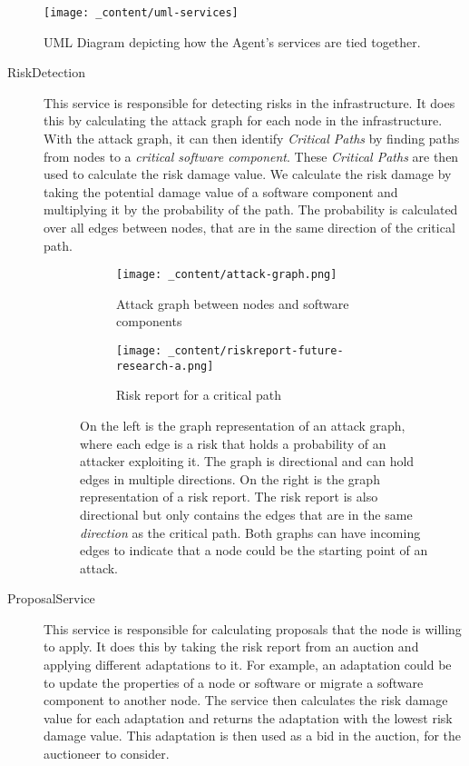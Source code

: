 \begin{figure}[H]
    \centering
    \texttt{[image: \_content/uml-services]}
    \caption{UML Diagram depicting how the Agent's services are tied together.}
    \label{fig:uml-services}
\end{figure}

\begin{description}
    \item[RiskDetection] This service is responsible for detecting risks in the infrastructure. It does this by calculating the attack graph for each node in the infrastructure. With the attack graph, it can then identify \textit{Critical Paths} by finding paths from nodes to a \textit{critical software component}. These \textit{Critical Paths} are then used to calculate the risk damage value. We calculate the risk damage by taking the potential damage value of a software component and multiplying it by the probability of the path. The probability is calculated over all edges between nodes, that are in the same direction of the critical path. 
    \begin{figure}[H]
        \centering
        \begin{subfigure}[b]{0.4\textwidth}
            \centering
            \texttt{[image: \_content/attack-graph.png]}
            \caption{Attack graph between nodes and software components}
            \label{fig:attack-graph}
        \end{subfigure}
        \hspace{0.5cm}
        \centering
        \begin{subfigure}[b]{0.4\textwidth}
            \centering
            \texttt{[image: \_content/riskreport-future-research-a.png]}
            \caption{Risk report for a critical path}
            \label{fig:risk-report}
        \end{subfigure}
        \caption{On the left is the graph representation of an attack graph, where each edge is a risk that holds a probability of an attacker exploiting it. The graph is directional and can hold edges in multiple directions. On the right is the graph representation of a risk report. The risk report is also directional but only contains the edges that are in the same \textit{direction} as the critical path. Both graphs can have incoming edges to indicate that a node could be the starting point of an attack.}
    \end{figure}

    \item[ProposalService] This service is responsible for calculating proposals that the node is willing to apply. It does this by taking the risk report from an auction and applying different adaptations to it. For example, an adaptation could be to update the properties of a node or software or migrate a software component to another node. The service then calculates the risk damage value for each adaptation and returns the adaptation with the lowest risk damage value. This adaptation is then used as a bid in the auction, for the auctioneer to consider. 
    

\end{description}
